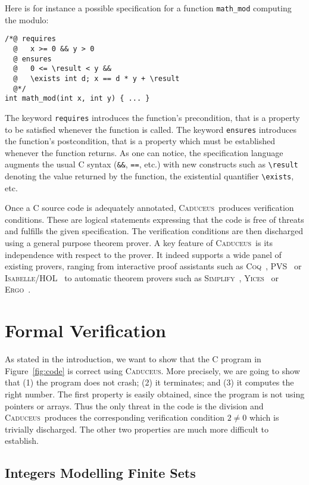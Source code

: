 \documentclass[a4paper]{llncs}
\newcommand{\caduceus}{\textsc{Caduceus}}
\newcommand{\simplify}{\textsc{Simplify}}
\newcommand{\ergo}{\textsc{Ergo}}
\newcommand{\yices}{\textsc{Yices}}
\newcommand{\coq}{\textsc{Coq}}
\begin{document}
Here is for instance a possible specification for a function
\texttt{math\_mod} computing the modulo:
\begin{verbatim}
/*@ requires 
  @   x >= 0 && y > 0
  @ ensures 
  @   0 <= \result < y &&
  @   \exists int d; x == d * y + \result
  @*/
int math_mod(int x, int y) { ... }
\end{verbatim}
The keyword \texttt{requires} introduces the function's precondition,
that is a property to be satisfied whenever the function is called.
The keyword \texttt{ensures} introduces the function's postcondition,
that is a property which must be established whenever the function returns.
As one can notice, the specification language augments the usual
C syntax (\verb!&&!, \verb!==!, etc.) with new constructs such as
\verb!\result! denoting the value returned by the function, the
existential quantifier \verb!\exists!, etc.

Once a C source code is adequately annotated, \caduceus\
produces verification conditions. These are logical statements
expressing that the code is free of threats and fulfills the given
specification. The verification conditions are then discharged using a
general purpose theorem prover. A key feature of \caduceus\ is
its independence with respect to the prover. It indeed supports a wide
panel of existing provers, ranging from interactive proof assistants
such as \coq~\cite{coq}, PVS~\cite{PVS} or
\textsc{Isabelle/HOL}~\cite{Isabelle} to 
automatic theorem provers such as 
\simplify~\cite{simplify}, \yices~\cite{yices} or \ergo~\cite{ergo}.


\section{Formal Verification}\label{verif}

As stated in the introduction, we want to show that the C program in
Figure~\ref{fig:code} is correct using \caduceus. More precisely, we
are going to show that (1) the program does not crash; (2)
it terminates; and (3) it computes the right number.
The first property is easily obtained, since the program is not using
pointers or arrays. Thus the only threat in the code is the division and
\caduceus\ produces the corresponding verification condition $2\not=0$
which is trivially discharged. The other two properties are much more
difficult to establish.

\subsection{Integers Modelling Finite Sets}
\end{document}
